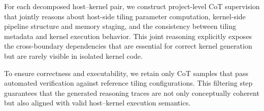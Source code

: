 For each decomposed host--kernel pair, we construct project-level CoT supervision that jointly reasons about host-side tiling parameter computation, kernel-side pipeline structure and memory staging, and the consistency between tiling metadata and kernel execution behavior. This joint reasoning explicitly exposes the cross-boundary dependencies that are essential for correct kernel generation but are rarely visible in isolated kernel code.

To ensure correctness and executability, we retain only CoT samples that pass automated verification against reference tiling configurations. This filtering step guarantees that the generated reasoning traces are not only conceptually coherent but also aligned with valid host--kernel execution semantics.


